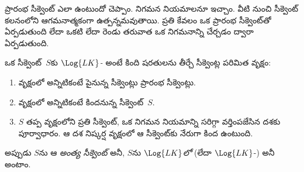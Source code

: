 \documentclass[../../../include/open-logic-section]{subfiles}
\begin{document}
      {}
      {}


\begin{explain}
ప్రారంభ సీక్వెంట్ ఎలా ఉంటుందో చెప్పాం. నిగమన నియమాలనూ ఇచ్చాం.
వీటి నుంచి సీక్వెంట్ కలనంలోని  ఆగమనాత్మకంగా
ఉత్పన్నమవుతాయి. ప్రతి  కేవలం ఒక ప్రారంభ సీక్వెంట్‌తో ఏర్పడుతుంది
లేదా ఒకటి లేదా రెండు  తరువాత ఒక నిగమనాన్ని చేర్చడం ద్వారా
ఏర్పడుతుంది.
\end{explain}

\begin{defn}
ఒక సీక్వెంట్~$S$కు \emph{$\Log{LK}$-} అంటే కింది
షరతులను తీర్చే సీక్వెంట్ల పరిమిత వృక్షం:
\begin{enumerate}
\item వృక్షంలో అన్నిటికంటే పైనున్న సీక్వెంట్లు ప్రారంభ సీక్వెంట్లు.
\item వృక్షంలో అన్నిటికంటే కిందనున్న సీక్వెంట్~$S$.
\item $S$ తప్ప వృక్షంలోని ప్రతి సీక్వెంట్, ఒక నిగమన నియమాన్ని సరిగ్గా
  వర్తింపజేసిన దశకు పూర్వాధారం. ఆ దశ నిష్కర్ష వృక్షంలో ఆ సీక్వెంట్‌కు
  నేరుగా కింద ఉంటుంది.
\end{enumerate}
అప్పుడు $S$ను ఆ  \emph{అంత్య సీక్వెంట్} అనీ,
$S$ను \emph{$\Log{LK}$లో } (లేదా
$\Log{LK}$-) అనీ అంటాం.
\end{defn}
\end{document}
